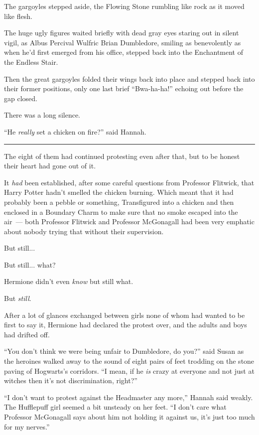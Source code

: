 The gargoyles stepped aside, the Flowing Stone rumbling like rock as it moved like flesh.

The huge ugly figures waited briefly with dead gray eyes staring out in silent vigil, as Albus Percival Wulfric Brian Dumbledore, smiling as benevolently as when he'd first emerged from his office, stepped back into the Enchantment of the Endless Stair.

Then the great gargoyles folded their wings back into place and stepped back into their former positions, only one last brief ``Bwa-ha-ha!'' echoing out before the gap closed.

There was a long silence.

``He \emph{really} set a chicken on fire?'' said Hannah.

\begin{center}\rule{3in}{0.4pt}\end{center}

The eight of them had continued protesting even after that, but to be honest their heart had gone out of it.

It \emph{had} been established, after some careful questions from Professor Flitwick, that Harry Potter hadn't smelled the chicken burning. Which meant that it had probably been a pebble or something, Transfigured into a chicken and then enclosed in a Boundary Charm to make sure that no smoke escaped into the air~--- both Professor Flitwick and Professor McGonagall had been very emphatic about nobody trying that without their supervision.

But still...

But still... what?

Hermione didn't even \emph{know} but still what.

But \emph{still}.

After a lot of glances exchanged between girls none of whom had wanted to be first to say it, Hermione had declared the protest over, and the adults and boys had drifted off.

``You don't think we were being unfair to Dumbledore, do you?'' said Susan as the heroines walked away to the sound of eight pairs of feet trodding on the stone paving of Hogwarts's corridors. ``I mean, if he \emph{is} crazy at everyone and not just at witches then it's not discrimination, right?''

``I don't want to protest against the Headmaster any more,'' Hannah said weakly. The Hufflepuff girl seemed a bit unsteady on her feet. ``I don't care what Professor McGonagall says about him not holding it against us, it's just too much for my nerves.''


